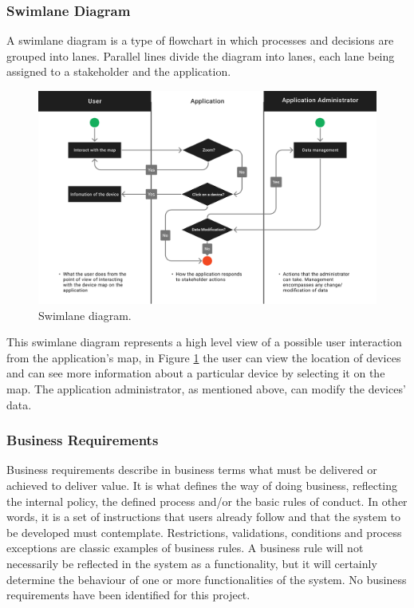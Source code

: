 \subsubsection{Swimlane Diagram}

A swimlane diagram is a type of flowchart in which processes and decisions
are grouped into lanes. Parallel lines divide the diagram into lanes, each
lane being assigned to a stakeholder and the application.

\begin{figure}[H]
    \centering
    \includegraphics[width=15cm]{../app/docs/software_requirements/assets/images/swimlane_diagram.png}
    \caption{Swimlane diagram.}
    \label{fig:diagram swimlane}
\end{figure}

This swimlane diagram represents a high level view of a possible user interaction
from the application's map, in Figure \ref{fig:diagram swimlane} the user can view the location of
\hyperlink{\acronym}{\acronym} devices and can see more information about a particular device by selecting
it on the map. The application administrator, as mentioned above, can modify the
devices' data.

\subsubsection{Business Requirements}

Business requirements describe in business terms what must be delivered
or achieved to deliver value. It is what defines the way of doing business,
reflecting the internal policy, the defined process and/or the basic rules
of conduct.  In other words, it is a set of instructions that users already
follow and that the system to be developed must contemplate. Restrictions,
validations, conditions and process exceptions are classic examples of business
rules. A business rule will not necessarily be reflected in the system as
a functionality, but it will certainly determine the behaviour of one or
more functionalities of the system.
\newline
No business requirements have been identified for this project.

